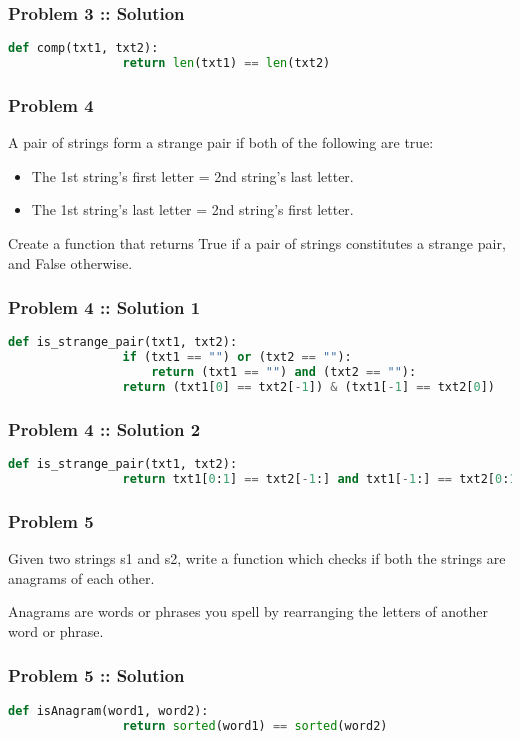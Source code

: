 \documentclass[14pt]{beamer}
\begin{document}
    \begin{frame}[containsverbatim]
        \frametitle{Problem 3 :: Solution}
        \begin{lstlisting}[language=Python]
            def comp(txt1, txt2):
                return len(txt1) == len(txt2)
        \end{lstlisting}
    \end{frame}

    \begin{frame}
        \frametitle{Problem 4}
        A pair of strings form a strange pair if both of the following are true:
        \begin{itemize}
            \item The 1st string's first letter = 2nd string's last letter.
            \item The 1st string's last letter = 2nd string's first letter.
        \end{itemize}
        \alert{Create a function that returns True if a pair of strings constitutes a strange pair, and False otherwise.}
    \end{frame}

    \begin{frame}[containsverbatim]
        \frametitle{Problem 4 :: Solution 1}
        \begin{lstlisting}[language=Python]
            def is_strange_pair(txt1, txt2):
                if (txt1 == "") or (txt2 == ""):
                    return (txt1 == "") and (txt2 == ""):
                return (txt1[0] == txt2[-1]) & (txt1[-1] == txt2[0])
        \end{lstlisting}
    \end{frame}

    \begin{frame}[containsverbatim]
        \frametitle{Problem 4 :: Solution 2}
        \begin{lstlisting}[language=Python]
            def is_strange_pair(txt1, txt2):
                return txt1[0:1] == txt2[-1:] and txt1[-1:] == txt2[0:1]
        \end{lstlisting}
    \end{frame}

    \begin{frame}
        \frametitle{Problem 5}
        \alert{Given two strings s1 and s2, write a function which checks if both the strings are anagrams of each other.}

        Anagrams are words or phrases you spell by rearranging the letters of another word or phrase.
    \end{frame}

    \begin{frame}[containsverbatim]
        \frametitle{Problem 5 :: Solution}
        \begin{lstlisting}[language=Python]
            def isAnagram(word1, word2):
                return sorted(word1) == sorted(word2)
        \end{lstlisting}
    \end{frame}
\end{document}
